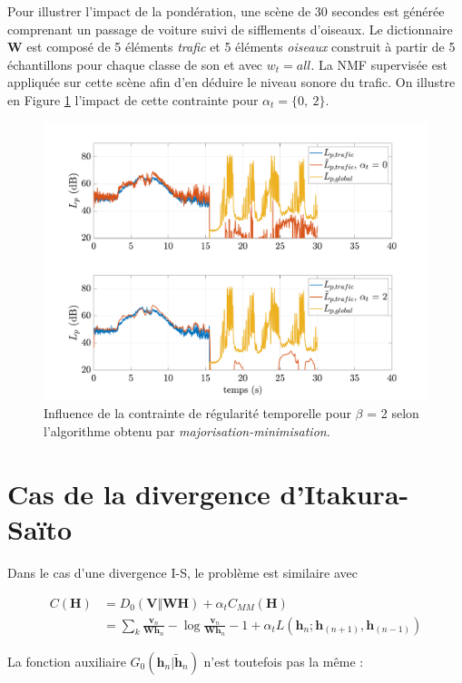 Pour illustrer l'impact de la pondération, une scène de 30 secondes est générée comprenant un passage de voiture suivi de sifflements d'oiseaux. Le dictionnaire $\mathbf{W}$ est composé de 5 éléments \textit{trafic} et 5 éléments \textit{oiseaux} construit à partir de 5 échantillons pour chaque classe de son et avec $w_t = all$. La NMF supervisée est appliquée sur cette scène afin d'en déduire le niveau sonore du trafic. On illustre en Figure \ref{fig:smooth_2} l'impact de cette contrainte pour $\alpha_t = \lbrace 0,~2\rbrace$. 

\begin{figure}[h]
\centering
\includegraphics[width=.9\linewidth]{./figures/NMF/LpSmooth_2.pdf}
\caption{Influence de la contrainte de régularité temporelle pour $\beta$ = 2 selon l'algorithme obtenu par \textit{majorisation-minimisation}.}
\label{fig:smooth_2}
\end{figure}


\section{Cas de la divergence d'Itakura-Saïto}
Dans le cas d'une divergence I-S, le problème est similaire avec

\begin{align}
C(\mathbf{H}) &= D_0(\mathbf{V} \Vert \mathbf{WH}) + \alpha_t C_{MM}(\mathbf{H})\\
 &= \sum_k\frac{\mathbf{v}_n}{\mathbf{Wh}_n}-\log \frac{\mathbf{v}_n}{\mathbf{Wh}_n}-1+\alpha_t L(\mathbf{h}_{n}; \mathbf{h}_{(n+1)}, \mathbf{h}_{(n-1)}) 
\end{align}

La fonction auxiliaire $G_0(\mathbf{h}_{n}\vert \mathbf{\tilde{h}}_{n})$ n'est toutefois pas la même : 

